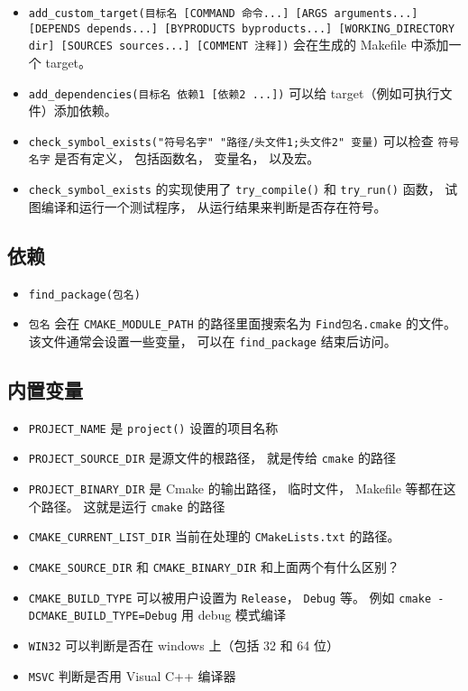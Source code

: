\begin{itemize}
\item \verb|add_custom_target(目标名 [COMMAND 命令...] [ARGS arguments...] [DEPENDS depends...] [BYPRODUCTS byproducts...] [WORKING_DIRECTORY dir] [SOURCES sources...] [COMMENT 注释])| 会在生成的 Makefile 中添加一个 target。
\item \verb|add_dependencies(目标名 依赖1 [依赖2 ...])| 可以给 target（例如可执行文件）添加依赖。
\item \verb|check_symbol_exists("符号名字" "路径/头文件1;头文件2" 变量)| 可以检查 \verb|符号名字| 是否有定义， 包括函数名， 变量名， 以及宏。
\item \verb|check_symbol_exists| 的实现使用了 \verb|try_compile()| 和 \verb|try_run()| 函数， 试图编译和运行一个测试程序， 从运行结果来判断是否存在符号。
\end{itemize}

\subsection{依赖}
\begin{itemize}
\item \verb|find_package(包名)|
\item \verb|包名| 会在 \verb|CMAKE_MODULE_PATH| 的路径里面搜索名为 \verb|Find包名.cmake| 的文件。 该文件通常会设置一些变量， 可以在 \verb|find_package| 结束后访问。
\end{itemize}


\subsection{内置变量}
\begin{itemize}
\item \verb|PROJECT_NAME| 是 \verb|project()| 设置的项目名称
\item \verb`PROJECT_SOURCE_DIR` 是源文件的根路径， 就是传给 \verb`cmake` 的路径
\item \verb`PROJECT_BINARY_DIR` 是 Cmake 的输出路径， 临时文件， Makefile 等都在这个路径。 这就是运行 \verb`cmake` 的路径
\item \verb|CMAKE_CURRENT_LIST_DIR| 当前在处理的 \verb|CMakeLists.txt| 的路径。
\item \verb|CMAKE_SOURCE_DIR| 和 \verb|CMAKE_BINARY_DIR| 和上面两个有什么区别？
\item \verb|CMAKE_BUILD_TYPE| 可以被用户设置为 \verb|Release|， \verb|Debug| 等。 例如 \verb|cmake -DCMAKE_BUILD_TYPE=Debug| 用 debug 模式编译
\item \verb|WIN32| 可以判断是否在 windows 上（包括 32 和 64 位）
\item \verb|MSVC| 判断是否用 Visual C++ 编译器
\end{itemize}

